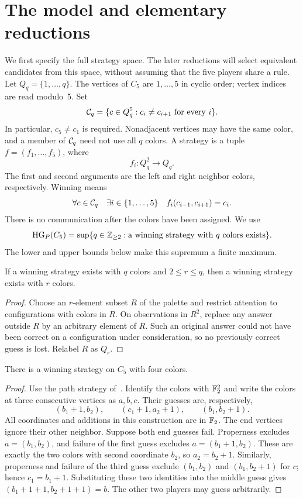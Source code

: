 \section{The model and elementary reductions}\label{sec:preliminaries}
We first specify the full strategy space. The later reductions will select
equivalent candidates from this space, without assuming that the five
players share a rule.
Let $Q_q=\{1,\ldots,q\}$. The vertices of $C_5$ are $1,\ldots,5$ in cyclic
order; vertex indices are read modulo~5. Set
\[
\mathcal{C}_q=\{c\in Q_q^5:c_i\ne c_{i+1}\text{ for every }i\}.
\]
In particular, $c_5\ne c_1$ is required. Nonadjacent vertices may have the
same color, and a member of $\mathcal{C}_q$ need not use all $q$ colors. A
strategy is a tuple $f=(f_1,\ldots,f_5)$, where
\[
f_i:Q_q^2\longrightarrow Q_q.
\]
The first and second arguments are the left and right neighbor colors,
respectively. Winning means
\begin{equation}\label{eq:winning}
\forall c\in\mathcal{C}_q\quad
\exists i\in\{1,\ldots,5\}\quad
f_i(c_{i-1},c_{i+1})=c_i.
\end{equation}
There is no communication after the colors have been assigned.
We use
\[
\operatorname{HG}_{P}(C_5)=\sup\{q\in\mathbb Z_{\geq2}:\text{a winning strategy with $q$ colors exists}\}.
\]
The lower and upper bounds below make this supremum a finite maximum.

\begin{lemma}\label{lem:palette}
If a winning strategy exists with $q$ colors and $2\leq r\leq q$, then a
winning strategy exists with $r$ colors.
\end{lemma}
\begin{proof}
Choose an $r$-element subset $R$ of the palette and restrict attention to
configurations with colors in $R$. On observations in $R^2$, replace any
answer outside $R$ by an arbitrary element of $R$. Such an original answer
could not have been correct on a configuration under consideration, so no
previously correct guess is lost. Relabel $R$ as $Q_r$.
\end{proof}

\begin{proposition}\label{prop:four}
There is a winning strategy on $C_5$ with four colors.
\end{proposition}
\begin{proof}
Use the path strategy of~\cite[Lemma~4.1]{proper}. Identify the colors with
$\mathbb{F}_2^2$ and write the colors at three consecutive vertices as $a,b,c$.
Their guesses are, respectively,
\[
(b_1+1,b_2),\qquad(c_1+1,a_2+1),\qquad(b_1,b_2+1).
\]
All coordinates and additions in this construction are in $\mathbb{F}_2$.
The end vertices ignore their other neighbor. Suppose both end guesses
fail. Properness excludes $a=(b_1,b_2)$, and failure of the first guess
excludes $a=(b_1+1,b_2)$. These are exactly the two colors with second
coordinate $b_2$, so $a_2=b_2+1$. Similarly, properness and failure of
the third guess exclude $(b_1,b_2)$ and $(b_1,b_2+1)$ for $c$; hence
$c_1=b_1+1$. Substituting these two identities into the middle guess
gives $(b_1+1+1,b_2+1+1)=b$.
The other two players may guess arbitrarily.
\end{proof}

